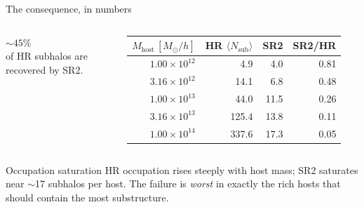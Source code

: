 \documentclass[aspectratio=169]{beamer}
\begin{document}
\begin{frame}{The consequence, in numbers}
\small
\begin{columns}[T]
\centering
\vspace{0.2cm}
{\Large \textbf{$\sim45\%$}}\\[0.15cm]
of HR subhalos are recovered by SR2.
\centering
\begin{tabular}{r r r r}
\hline
$M_{\mathrm{host}}\,[M_\odot/h]$ & HR $\langle N_{\mathrm{sub}}\rangle$
& SR2 & SR2/HR \\
\hline
$1.00\times10^{12}$ & 4.9   & 4.0  & 0.81 \\
$3.16\times10^{12}$ & 14.1  & 6.8  & 0.48 \\
$1.00\times10^{13}$ & 44.0  & 11.5 & 0.26 \\
$3.16\times10^{13}$ & 125.4 & 13.8 & 0.11 \\
$1.00\times10^{14}$ & 337.6 & 17.3 & \alert{0.05} \\
\hline
\end{tabular}
\end{columns}

\vspace{0.35cm}
\begin{block}{Occupation saturation}
HR occupation rises steeply with host mass; SR2 saturates near $\sim$17 subhalos
per host. The failure is \emph{worst} in exactly the rich hosts that should
contain the most substructure.
\end{block}
\end{frame}

\end{document}
